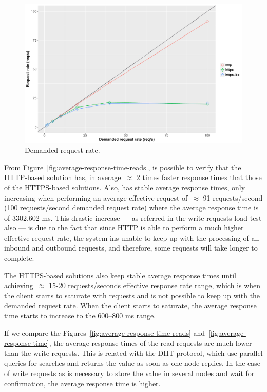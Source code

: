 \begin{figure}[h!]
  \centering
  \includegraphics[scale=0.4]{Figures/evaluation/request-rate-reads-linear-new.pdf}
  \caption{Demanded request rate.}
  \label{fig:demanded-request-rate-reads}
\end{figure}

From Figure~\ref{fig:average-response-time-reads}, is possible to verify that the HTTP-based solution has, in average~$\approx$ 2 times faster response times that those of the HTTPS-based solutions.
Also, has stable average response times, only increasing when performing an average effective request of~$\approx$ 91 requests/second (100 requests/second demanded request rate) where the average response time is of 3302.602 ms.
This drastic increase — as referred in the write requests load test also — is due to the fact that since HTTP is able to perform a much higher effective request rate, the system ins unable to keep up with the processing of all inbound and outbound requests, and therefore, some requests will take longer to complete.

The HTTPS-based solutions also keep stable average response times until achieving~$\approx$ 15-20 requests/seconds effective response rate range, which is when the client starts to saturate with requests and is not possible to keep up with the demanded request rate.
When the client starts to saturate, the average response time starts to increase to the 600–800 ms range.

If we compare the Figures~\ref{fig:average-response-time-reads} and~\ref{fig:average-response-time}, the average response times of the read requests are much lower than the write requests.
This is related with the DHT protocol, which use parallel queries for searches and returns the value as soon as one node replies.
In the case of write requests as is necessary to store the value in several nodes and wait for confirmation, the average response time is higher.

